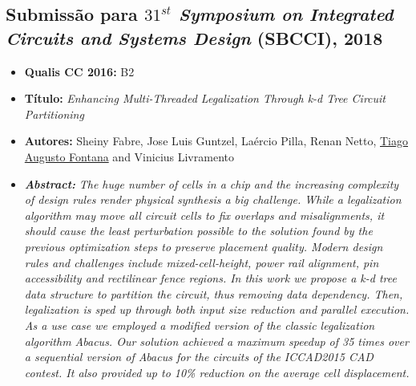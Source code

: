 \subsection{Submissão para \textit{$31^{st}$ Symposium on Integrated Circuits and Systems Design} (SBCCI), 2018}

\begin{itemize}
    \item \textbf{Qualis CC 2016:} B2
    \item \textbf{Título:} \textit{Enhancing Multi-Threaded Legalization Through \textit{k}-d Tree Circuit Partitioning}
    \item \textbf{Autores:} Sheiny Fabre, Jose Luis Guntzel, Laércio Pilla, Renan Netto, \underline{Tiago Augusto Fontana} and Vinicius Livramento
    \item \textbf{\textit{Abstract:}} \emph{The huge number of cells in a chip and the increasing complexity of design rules render physical synthesis a big challenge. While a legalization algorithm may move all circuit cells to fix overlaps and misalignments, it should cause the least perturbation possible to the solution found by the previous optimization steps to preserve placement quality. Modern design rules and challenges include mixed-cell-height, power rail alignment, pin accessibility and rectilinear fence regions. In this work we propose a \textit{k}-d tree data structure to partition the circuit, thus removing data dependency. Then, legalization is sped up through both input size reduction and parallel execution. As a use case we employed a modified version of the classic legalization algorithm Abacus. Our solution achieved a maximum speedup of 35 times over a sequential version of Abacus for the circuits of the ICCAD2015 CAD contest. It also provided up to 10\% reduction on the average cell displacement.}
\end{itemize}